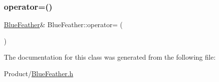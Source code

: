 \subsubsection{\texorpdfstring{operator=()}{operator=()}}
{\footnotesize\ttfamily \mbox{\hyperlink{classBlueFeather}{Blue\+Feather}}\& Blue\+Feather\+::operator= (\begin{DoxyParamCaption}\item[{const \mbox{\hyperlink{classBlueFeather}{Blue\+Feather}} \&}]{ }\end{DoxyParamCaption})}



The documentation for this class was generated from the following file\+:\begin{DoxyCompactItemize}
\item 
Product/\mbox{\hyperlink{BlueFeather_8h}{Blue\+Feather.\+h}}\end{DoxyCompactItemize}
